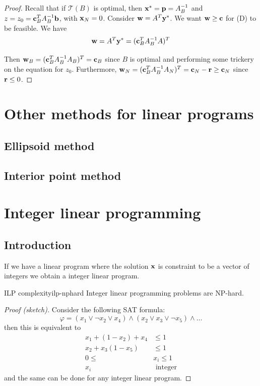 \documentclass[12pt]{extarticle}
\renewcommand{\vec}[1]{\bvec{#1}}
\begin{document}
\begin{proof}
	Recall that if $\mathcal T(B)$ is optimal, then $\vec x^* = \vec p = A_B^{-1}$ and
	$z = z_0 = \vec c^T_B A_B^{-1} \vec b$, with $\vec x_N = 0$.
	Consider $\vec w = A^T \vec y^*$. We want $\vec w \geq \vec c$ for (D) to be feasible.
	We have
	\begin{equation}
		\vec w = A^T \vec y^* = (\vec c^T_B A_B^{-1} A)^T
	\end{equation}

	Then $\vec w_B = (\vec c_B^T A_B^{-1}A_B)^T = \vec c_B$ since $B$ is optimal and performing some
	trickery on the equation for $z_0$.
	Furthermore, $\vec w_N  = (\vec c_B^T A_B^{-1}A_N)^T = \vec c_N - \vec r \geq \vec c_N$ since
	$\vec r \leq 0$.
\end{proof}

\section{Other methods for linear programs}
\subsection{Ellipsoid method}

\subsection{Interior point method}

\section{Integer linear programming}

\subsection{Introduction}

If we have a linear program where the solution $\vec x$ is constraint to be a vector of integers
we obtain a integer linear program.

\begin{theorem}{ILP complexity}{ilp-nphard}
	Integer linear programming problems are NP-hard.
\end{theorem}
\begin{proof}[Proof (sketch)]
	Consider the following SAT formula:
	\begin{equation}
		\varphi = (x_1 \lor \lnot x_2 \lor x_4) \land (x_2 \lor x_3 \lor \lnot x_5) \land \dots
	\end{equation}
	then
	this is equivalent to
	\begin{align}
		x_1 + (1-x_2) + x_4    & \leq 1          \\
		x_2 + x_3 (1 - x_5)    & \leq 1          \\
		0 \leq              {} & x_i \leq 1      \\
		x_i                    & \text{ integer}
	\end{align}
	and the same can be done for any integer linear program.
\end{proof}
\end{document}
